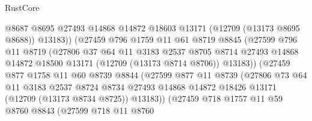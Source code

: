 \begin{lexlean}{RustCore}
\begin{coremodule}
                            @8687
                            @8695
                            @27493
                            @14868
                            @14872
                            @18603
                            @13171
                            (@12709 (@13173 @8695 @8688))
                            @13183))
                        (@27459
                          @796
                          @1759
                          @11
                          @61
                          @8719
                          @8845
                          (@27599
                            @796
                            @11
                            @8719
                            (@27806
                              @37
                              @64
                              @11
                              @3183
                              @2537
                              @8705
                              @8714
                              @27493
                              @14868
                              @14872
                              @18500
                              @13171
                              (@12709 (@13173 @8714 @8706))
                              @13183))
                          (@27459
                            @877
                            @1758
                            @11
                            @60
                            @8739
                            @8844
                            (@27599
                              @877
                              @11
                              @8739
                              (@27806
                                @73
                                @64
                                @11
                                @3183
                                @2537
                                @8724
                                @8734
                                @27493
                                @14868
                                @14872
                                @18426
                                @13171
                                (@12709 (@13173 @8734 @8725))
                                @13183))
                            (@27459
                              @718
                              @1757
                              @11
                              @59
                              @8760
                              @8843
                              (@27599
                                @718
                                @11
                                @8760

\end{coremodule}
\end{lexlean}
